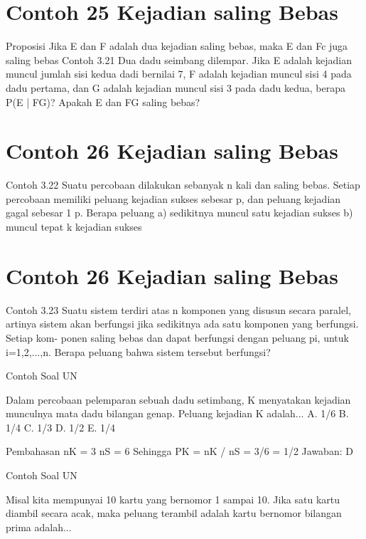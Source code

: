 \documentclass[11pt,fleqn]{book} %
\begin{document}
{{\section{Contoh 25 Kejadian saling Bebas}

Proposisi Jika E dan F adalah dua kejadian saling bebas, maka E dan Fc juga saling bebas
Contoh 3.21 Dua dadu seimbang dilempar. Jika E adalah kejadian muncul jumlah sisi kedua dadi bernilai 7, F adalah kejadian muncul sisi 4 pada dadu pertama, dan G adalah kejadian muncul sisi 3 pada dadu kedua, berapa P(E | FG)? Apakah E dan FG saling bebas?

\vspace{0.5in}
\section{Contoh 26 Kejadian saling Bebas}

Contoh 3.22 Suatu percobaan dilakukan sebanyak n kali dan saling bebas. Setiap percobaan memiliki peluang kejadian sukses sebesar p, dan peluang kejadian gagal sebesar 1 p. Berapa peluang
a) sedikitnya muncul satu kejadian sukses
b) muncul tepat k kejadian sukses

\vspace{0.5in}
\section{Contoh 26 Kejadian saling Bebas}
Contoh 3.23 Suatu sistem terdiri atas n komponen yang disusun secara paralel, artinya sistem akan berfungsi jika sedikitnya ada satu komponen yang berfungsi. Setiap kom- ponen saling bebas dan dapat berfungsi dengan peluang pi, untuk i=1,2,...,n. Berapa peluang bahwa sistem tersebut berfungsi?

\vspace{0.5in}
Contoh Soal UN

Dalam percobaan pelemparan sebuah dadu setimbang, K menyatakan kejadian munculnya mata dadu bilangan genap. Peluang kejadian K adalah...
A. 1/6
B. 1/4
C. 1/3
D. 1/2
E. 1/4

\vspace{0.5in}

Pembahasan
nK = 3
nS = 6
Sehingga PK = nK / nS = 3/6 = 1/2
Jawaban: D

\vspace{0.5in}

Contoh Soal UN

Misal kita mempunyai 10 kartu yang bernomor 1 sampai 10. Jika satu kartu diambil secara acak, maka peluang terambil adalah kartu bernomor bilangan prima adalah...

}}
\end{document}
